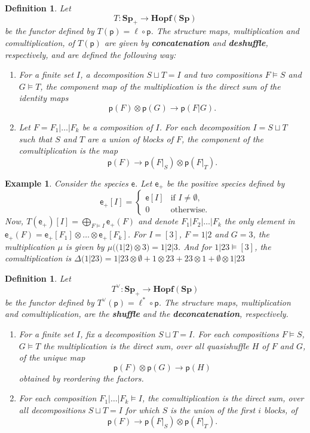 \documentclass[11pt,reqno]{amsart}
\numberwithin{equation}{section}
\newtheorem{ex}[theorem]{Example}
\newtheorem{definition}[theorem]{Definition}
\def\Sp{{\mathbf{Sp}}}
\def\p{{\textsf{p}}}
\def\exp{{\textsf{e}}}
\begin{document}
\begin{definition}
Let
$$T:\Sp_+\rightarrow \mathbf{Hopf}(\Sp)$$
be the functor defined by $T(\p)=\ell\circ \p$. The structure maps, multiplication and comultiplication, of $T(\p)$ are given by {\bf concatenation} and {\bf deshuffle}, respectively, and are defined the following way:
\begin{enumerate}
\item For a finite set $I$, a decomposition $S\sqcup T=I$ and two compositions $F\models S$ and $G\models T$, the component map of the multiplication is the direct sum of the identity maps
$$\p(F)\otimes \p(G)\rightarrow \p(F|G).$$
\item Let $F=F_1|\dots |F_k$ be a composition of $I$. For each decomposition $I=S\sqcup T$ such that $S$ and $T$ are a union of blocks of $F$, the component of the comultiplication is the map
\begin{equation}
\p(F)\rightarrow \p(F|_S)\otimes \p(F|_T).
\end{equation}
\end{enumerate}
\end{definition}


\begin{ex}
Consider the species $\exp$. Let $\exp_+$ be the positive species defined by
\begin{equation} \exp_+[I]=\begin{cases} \exp[I] & \text{if $I\neq \emptyset$,}\\ 0 & \text{otherwise.}\end{cases}\end{equation}
Now, $T(\exp_+)[I]=\bigoplus_{F\models I} \exp_+(F)$ and denote $F_1|F_2|\dots|F_k$ the only element in $\exp_+(F)=\exp_+[F_1]\otimes \dots \otimes \exp_+[F_k]$. For $I=[3]$, $F=1|2$ and $G=3$, the multiplication $\mu$ is given by $\mu((1|2)\otimes 3)= 1|2|3$. And for $1|23\models [3]$, the comultiplication is $\Delta(1|23) = 1|23\otimes \emptyset + 1\otimes 23 + 23\otimes 1 + \emptyset\otimes 1|23$
\end{ex}


\begin{definition}\label{Tvee}
Let
$$T^{\vee}:\Sp_+\rightarrow \mathbf{Hopf}(\Sp)$$
be the functor defined by $T^{\vee}(\p)=\ell^{\ast}\circ \p$. The structure maps, multiplication and comultiplication, are the {\bf shuffle} and the {\bf deconcatenation}, respectively. 
\begin{enumerate}
\item For a finite set $I$, fix a decomposition $S\sqcup T=I$. For each compositions $F\models S$, $G\models T$ the multiplication is the direct sum, over all quasishuffle $H$ of $F$ and $G$, of the unique map
$$\p(F)\otimes\p(G)\rightarrow \p(H)$$
obtained by reordering the factors.
\item For each composition $F_1|\dots |F_k\models I$, the comultiplication is the direct sum, over all decompositions $S\sqcup T=I$ for which $S$ is the union of the first
$i$ blocks, of
$$\p(F)\rightarrow \p(F|_S)\otimes \p(F|_T).$$
\end{enumerate}
\end{definition}
\end{document}
